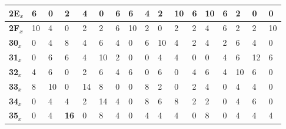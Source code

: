 \begin{longtable}[c]{|l|l|l|l|l|l|l|l|l|l|l|l|l|l|l|l|l|}
\textbf{2E$_x$} & 6              & 0              & 2              & 4              & 0              & 6              & 6              & 4              & 2              & 10             & 6              & 10             & 6              & 2              & 0              & 0              \\ \hline
\textbf{2F$_x$} & 10             & 4              & 0              & 2              & 2              & 6              & 10             & 2              & 0              & 2              & 2              & 4              & 6              & 2              & 2              & 10             \\ \hline
\textbf{30$_x$} & 0              & 4              & 8              & 4              & 6              & 4              & 0              & 6              & 10             & 4              & 2              & 4              & 2              & 6              & 4              & 0              \\ \hline
\textbf{31$_x$} & 0              & 6              & 6              & 4              & 10             & 2              & 0              & 0              & 4              & 4              & 0              & 0              & 4              & 6              & 12             & 6              \\ \hline
\textbf{32$_x$} & 4              & 6              & 0              & 2              & 6              & 4              & 6              & 0              & 6              & 0              & 4              & 6              & 4              & 10             & 6              & 0              \\ \hline
\textbf{33$_x$} & 8              & 10             & 0              & 14             & 8              & 0              & 0              & 8              & 2              & 0              & 2              & 4              & 0              & 4              & 4              & 0              \\ \hline
\textbf{34$_x$} & 0              & 4              & 4              & 2              & 14             & 4              & 0              & 8              & 6              & 8              & 2              & 2              & 0              & 4              & 6              & 0              \\ \hline
\textbf{35$_x$} & 0              & 4              & \textbf{16}             & 0              & 8              & 4              & 0              & 4              & 4              & 4              & 0              & 8              & 0              & 4              & 4              & 4              \\ \hline

\end{longtable}
